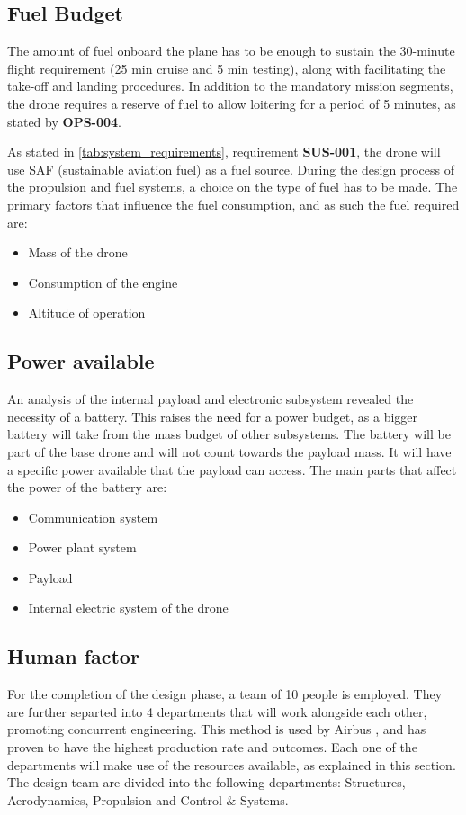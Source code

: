\subsection{Fuel Budget}
The amount of fuel onboard the plane has to be enough to sustain the 30-minute flight requirement (25 min cruise and 5 min testing), along with facilitating the take-off and landing procedures. In addition to the mandatory mission segments, the drone requires a reserve of fuel to allow loitering for a period of 5 minutes, as stated by \textbf{OPS-004}.

As stated in \autoref{tab:system_requirements}, requirement \textbf{SUS-001}, the drone will use SAF (sustainable aviation fuel) as a fuel source. During the design process of the propulsion and fuel systems, a choice on the type of fuel has to be made.
The primary factors that influence the fuel consumption, and as such the fuel required are:
\begin{itemize}
    \item Mass of the drone
    \item Consumption of the engine
    \item Altitude of operation
\end{itemize}

\subsection{Power available}
An analysis of the internal payload and electronic subsystem revealed the necessity of a battery. This raises the need for a power budget, as a bigger battery will take from the mass budget of other subsystems. The battery will be part of the base drone and will not count towards the payload mass. It will have a specific power available that the payload can access.
The main parts that affect the power of the battery are:

\begin{itemize}
    \item Communication system
    \item Power plant system
    \item Payload
    \item Internal electric system of the drone
\end{itemize}

\subsection{Human factor}
For the completion of the design phase, a team of 10 people is employed. They are further separted into 4 departments that will work alongside each other, promoting concurrent engineering. This method is used by Airbus \cite{Airbus_Concurent}, and has proven to have the highest production rate and outcomes.
Each one of the departments will make use of the resources available, as explained in this section. The design team are divided into the following departments: Structures, Aerodynamics, Propulsion and Control \& Systems.


